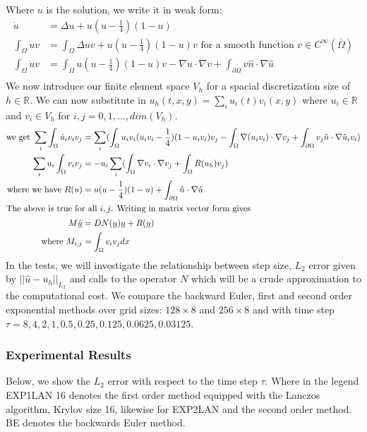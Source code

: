 Where $u$ is the solution, we write it in weak form:
\begin{align*}
    \dot u&=\Delta u+u(u-\frac14)(1-u)\\
    \int_{\Omega} \dot u v &=\int_{\Omega} \Delta uv+u(u-\frac14)(1-u)v \text{ for a smooth function $v \in C^{\infty}(\overline{\Omega})$}\\
    \int_{\Omega} \dot u v &=\int_{\Omega} u(u-\frac14)(1-u)v - \nabla u \cdot \nabla v + \int_{\partial\Omega}  v\hat n \cdot \nabla \hat u\\
\end{align*}
We now introduce our finite element space $V_h$ for a spacial discretization size of $h \in \mathbb{R}$.
We can now substitute in $u_h(t,x,y) = \sum_i u_i(t) v_i(x,y)$ where $u_i \in \mathbb{R}$ and $v_i \in V_h$ for $i,j = 0,1,...,dim(V_h)$.
\begin{align*}
    \text{we get } \sum_i\int_{\Omega} \dot u_i v_i v_j &=\sum_i(\int_{\Omega} u_iv_i(u_iv_i-\frac14)(1-u_iv_i)v_j - \int_{\Omega}\nabla (u_iv_i) \cdot \nabla v_j + \int_{\partial\Omega}  v_j\hat n \cdot \nabla \hat u_iv_i)\\
    \sum_iu_i\int_{\Omega}v_iv_j &= -u_i\sum_i(\int_{\Omega}\nabla v_i \cdot \nabla v_j + \int_{\Omega}R(u_h)v_j)\\
    \text{where we have } R(u)&=u(u-\frac14)(1-u) + \int_{\partial\Omega}  \hat n \cdot \nabla \hat  u\\
    \intertext{The above is true for all $i,j$. Writing in matrix vector form gives}
    M \underline{\dot u} &= DN(\underline{u})\underline{u} + R(\underline{u})\\
    \text{where } M_{i,j} &= \int_{\Omega}v_iv_jdx
\end{align*}
In the tests, we will investigate the relationship between step size, $L_2$ error given by $||\hat u - u_h||_{L_2}$ and calls to the operator $N$ which will be a crude approximation to the computational cost.
We compare the backward Euler, first and second order exponential methods over grid sizes: $128 \times 8$ and $256 \times 8$ and with time step $\tau=8,4,2,1,0.5,0.25,0.125,0.0625,0.03125$.

\subsubsection{Experimental Results}

Below, we show the $L_2$ error with respect to the time step $\tau$.
Where in the legend EXP1LAN 16 denotes the first order method equipped with the Lanczos algorithm, Krylov size 16, likewise for EXP2LAN and the second order method.
BE denotes the backwards Euler method.

